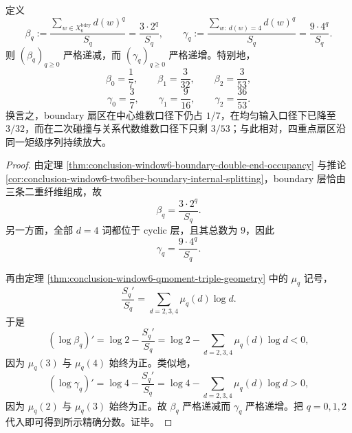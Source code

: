 \begin{corollary}\label{cor:conclusion-window6-boundary-fourpoint-moment-amplification}
定义
\[
\beta_q:=
\frac{\sum_{w\in X_6^{\mathrm{bdry}}}d(w)^q}{S_q}
=
\frac{3\cdot 2^q}{S_q},
\qquad
\gamma_q:=
\frac{\sum_{w:\ d(w)=4}d(w)^q}{S_q}
=
\frac{9\cdot 4^q}{S_q}.
\]
则 \((\beta_q)_{q\ge 0}\) 严格递减，而 \((\gamma_q)_{q\ge 0}\) 严格递增。特别地，
\[
\beta_0=\frac17,\qquad
\beta_1=\frac{3}{32},\qquad
\beta_2=\frac{3}{53},
\]
\[
\gamma_0=\frac37,\qquad
\gamma_1=\frac{9}{16},\qquad
\gamma_2=\frac{36}{53}.
\]
换言之，boundary 扇区在中心维数口径下仍占 \(1/7\)，在均匀输入口径下已降至 \(3/32\)，而在二次碰撞与关系代数维数口径下只剩 \(3/53\)；与此相对，四重点扇区沿同一矩级序列持续放大。
\end{corollary}
\begin{proof}
由定理 \ref{thm:conclusion-window6-boundary-double-end-occupancy} 与推论 \ref{cor:conclusion-window6-twofiber-boundary-internal-splitting}，boundary 层恰由三条二重纤维组成，故
\[
\beta_q=\frac{3\cdot 2^q}{S_q}.
\]
另一方面，全部 \(d=4\) 词都位于 cyclic 层，且其总数为 \(9\)，因此
\[
\gamma_q=\frac{9\cdot 4^q}{S_q}.
\]

再由定理 \ref{thm:conclusion-window6-qmoment-triple-geometry} 中的 \(\mu_q\) 记号，
\[
\frac{S_q'}{S_q}=\sum_{d=2,3,4}\mu_q(d)\log d.
\]
于是
\[
(\log\beta_q)'
=
\log 2-\frac{S_q'}{S_q}
=
\log 2-\sum_{d=2,3,4}\mu_q(d)\log d<0,
\]
因为 \(\mu_q(3)\) 与 \(\mu_q(4)\) 始终为正。类似地，
\[
(\log\gamma_q)'
=
\log 4-\frac{S_q'}{S_q}
=
\log 4-\sum_{d=2,3,4}\mu_q(d)\log d>0,
\]
因为 \(\mu_q(2)\) 与 \(\mu_q(3)\) 始终为正。故 \(\beta_q\) 严格递减而 \(\gamma_q\) 严格递增。把 \(q=0,1,2\) 代入即可得到所示精确分数。证毕。
\end{proof}

